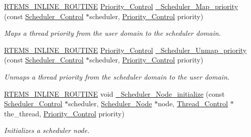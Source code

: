 \begin{DoxyCompactItemize}
\mbox{\hyperlink{group__RTEMSScoreBaseDefs_gac216239df231d5dbd15e3520b0b9313f}{R\+T\+E\+M\+S\+\_\+\+I\+N\+L\+I\+N\+E\+\_\+\+R\+O\+U\+T\+I\+NE}} \mbox{\hyperlink{group__RTEMSScorePriority_ga59d02b58072d31a9a1cfe644557aefe2}{Priority\+\_\+\+Control}} \mbox{\hyperlink{group__RTEMSScoreScheduler_ga01bd5513405dcafef3306676c55959c6}{\+\_\+\+Scheduler\+\_\+\+Map\+\_\+priority}} (const \mbox{\hyperlink{struct__Scheduler__Control}{Scheduler\+\_\+\+Control}} $\ast$scheduler, \mbox{\hyperlink{group__RTEMSScorePriority_ga59d02b58072d31a9a1cfe644557aefe2}{Priority\+\_\+\+Control}} priority)
\begin{DoxyCompactList}\small\item\em Maps a thread priority from the user domain to the scheduler domain. \end{DoxyCompactList}\item 
\mbox{\hyperlink{group__RTEMSScoreBaseDefs_gac216239df231d5dbd15e3520b0b9313f}{R\+T\+E\+M\+S\+\_\+\+I\+N\+L\+I\+N\+E\+\_\+\+R\+O\+U\+T\+I\+NE}} \mbox{\hyperlink{group__RTEMSScorePriority_ga59d02b58072d31a9a1cfe644557aefe2}{Priority\+\_\+\+Control}} \mbox{\hyperlink{group__RTEMSScoreScheduler_gaa2f56f77ed86e3d02527742f917fcd0c}{\+\_\+\+Scheduler\+\_\+\+Unmap\+\_\+priority}} (const \mbox{\hyperlink{struct__Scheduler__Control}{Scheduler\+\_\+\+Control}} $\ast$scheduler, \mbox{\hyperlink{group__RTEMSScorePriority_ga59d02b58072d31a9a1cfe644557aefe2}{Priority\+\_\+\+Control}} priority)
\begin{DoxyCompactList}\small\item\em Unmaps a thread priority from the scheduler domain to the user domain. \end{DoxyCompactList}\item 
\mbox{\hyperlink{group__RTEMSScoreBaseDefs_gac216239df231d5dbd15e3520b0b9313f}{R\+T\+E\+M\+S\+\_\+\+I\+N\+L\+I\+N\+E\+\_\+\+R\+O\+U\+T\+I\+NE}} void \mbox{\hyperlink{group__RTEMSScoreScheduler_ga6305be03088f2eda4f85c186a3bfd495}{\+\_\+\+Scheduler\+\_\+\+Node\+\_\+initialize}} (const \mbox{\hyperlink{struct__Scheduler__Control}{Scheduler\+\_\+\+Control}} $\ast$scheduler, \mbox{\hyperlink{structScheduler__Node}{Scheduler\+\_\+\+Node}} $\ast$node, \mbox{\hyperlink{struct__Thread__Control}{Thread\+\_\+\+Control}} $\ast$the\+\_\+thread, \mbox{\hyperlink{group__RTEMSScorePriority_ga59d02b58072d31a9a1cfe644557aefe2}{Priority\+\_\+\+Control}} priority)
\begin{DoxyCompactList}\small\item\em Initializes a scheduler node. \end{DoxyCompactList}\item 

\end{DoxyCompactItemize}
